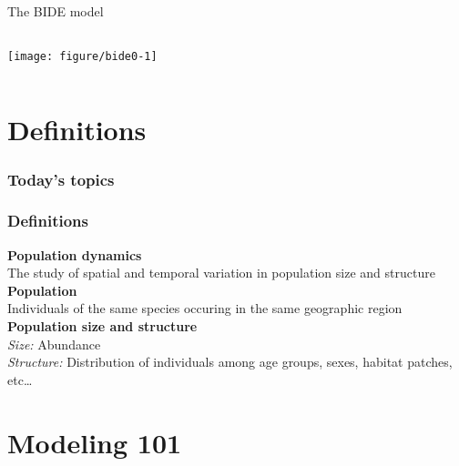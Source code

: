 \documentclass[color=usenames,dvipsnames]{beamer}\usepackage[]{graphicx}\usepackage[]{xcolor}
\begin{document}
\begin{frame}
  \centering
    \huge
    The BIDE model \\
    \vfill

\begin{columns}
  \column{\dimexpr\paperwidth-10pt}
  \centering
  \texttt{[image: figure/bide0-1]} \\
\end{columns}
\end{frame}



\section{Definitions}


\begin{frame}
  \frametitle{Today's topics}
  \LARGE
\end{frame}


\begin{frame}
  \frametitle{Definitions}
  {\bf Population dynamics \\}
    The study of spatial and temporal variation in population size and structure
  \pause
  \vfill
  {\bf Population \\}
    Individuals of the same species occuring in the same geographic region
  \pause
  \vfill
  {\bf Population size and structure \\}
    {\color{Red}
      \it Size:} Abundance \\
    {\color{Red}
      \it Structure:} Distribution of individuals among age groups, sexes,
    habitat patches, etc\dots
\end{frame}



\section{Modeling 101}
\end{document}
